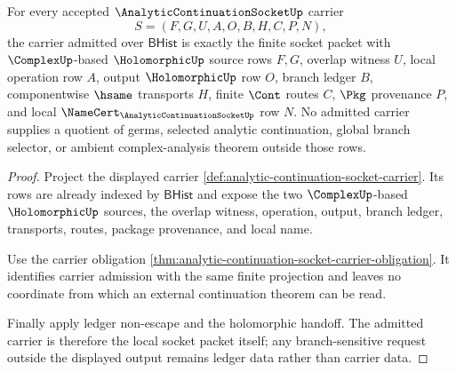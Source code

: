 \begin{theorem}
\label{thm:analytic-continuation-socket-carrier-admission}
For every accepted $\AnalyticContinuationSocketUp$ carrier
$$
S=(F,G,U,A,O,B,H,C,P,N),
$$
the carrier admitted over $\mathsf{BHist}$ is exactly the finite socket packet with $\ComplexUp$-based $\HolomorphicUp$ source rows $F,G$, overlap witness $U$, local operation row $A$, output $\HolomorphicUp$ row $O$, branch ledger $B$, componentwise $\hsame$ transports $H$, finite $\Cont$ routes $C$, $\Pkg$ provenance $P$, and local $\NameCert_{\AnalyticContinuationSocketUp}$ row $N$. No admitted carrier supplies a quotient of germs, selected analytic continuation, global branch selector, or ambient complex-analysis theorem outside those rows.
\end{theorem}
\begin{proof}
Project the displayed carrier \autoref{def:analytic-continuation-socket-carrier}. Its rows are already indexed by $\mathsf{BHist}$ and expose the two $\ComplexUp$-based $\HolomorphicUp$ sources, the overlap witness, operation, output, branch ledger, transports, routes, package provenance, and local name.

Use the carrier obligation \autoref{thm:analytic-continuation-socket-carrier-obligation}. It identifies carrier admission with the same finite projection and leaves no coordinate from which an external continuation theorem can be read.

Finally apply ledger non-escape and the holomorphic handoff. The admitted carrier is therefore the local socket packet itself; any branch-sensitive request outside the displayed output remains ledger data rather than carrier data.
\end{proof}

